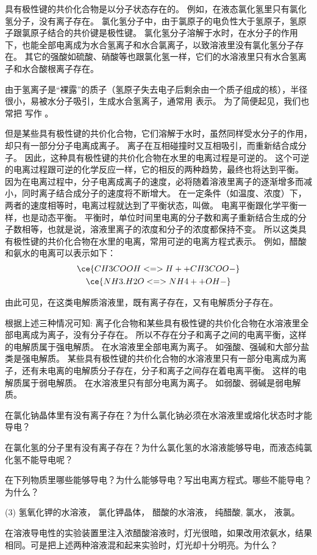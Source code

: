 具有极性键的共价化合物是以分子状态存在的。
例如，在液态氯化氢里只有氯化氢分子，没有离子存在。
氯化氢分子中，由于氯原子的电负性大于氢原子，氢原子跟氯原子结合的共价键是极性键。
氯化氢分子溶解于水时，在水分子的作用下，也能全部电离成为水合氢离子和水合氯离子，以致溶液里没有氯化氢分子存在。
其它的强酸如硫酸、硝酸等也跟氯化氢一样，它们的水溶液里只有水合氢离子和水合酸根离子存在。

由于氢离子是“裸露”的质子（氢原子失去电子后剩余由一个质子组成的核），半径很小，易被水分子吸引，生成水合氢离子，通常用  表示。
为了简便起见，我们也常把  写作 。

但是某些具有极性键的共价化合物，它们溶解于水时，虽然同样受水分子的作用，却只有一部分分子电离成离子。
离子在互相碰撞时又互相吸引，而重新结合成分子。
因此，这种具有极性键的共价化合物在水里的电离过程是可逆的。
这个可逆的电离过程跟可逆的化学反应一样，它的相反的两种趋势，最终也将达到平衡。
因为在电离过程中，分子电离成离子的速度，必将随着溶液里离子的逐渐增多而减小，同时离子结合成分子的速度将不断增大。
在一定条件（如温度、浓度）下，两者的速度相等时，电离过程就达到了平衡状态，叫做。
电离平衡跟化学平衡一样，也是动态平衡。
平衡时，单位时间里电离的分子数和离子重新结合生成的分子数相等，也就是说，溶液里离子的浓度和分子的浓度都保持不变。
所以这类具有极性键的共价化合物在水里的电离，常用可逆的电离方程式表示。
例如，醋酸和氨水的电离可以表示如下：
\begin{gather*}
  \ce{ CH3COOH <=> H+ + CH3COO-}\\
  \ce{ NH3.H2O <=> NH4+ + OH-}
\end{gather*}

由此可见，在这类电解质溶液里，既有离子存在，又有电解质分子存在。

根据上述三种情况可知: 离子化合物和某些具有极性键的共价化合物在水溶液里全部电离成为离子，没有分子存在。
所以不存在分子和离子之间的电离平衡，这样的电解质属于强电解质。
在水溶液里全部电离为离子。
如强酸、强碱和大部分盐类是强电解质。
某些具有极性键的共价化合物的水溶液里只有一部分电离成为离子，还有未电离的电解质分子存在，分子和离子之间存在着电离平衡。
这样的电解质属于弱电解质。
在水溶液里只有部分电离为离子。
如弱酸、弱碱是弱电解质。

\begin{Practice}[习题]
\begin{question}
  \item 在氯化钠晶体里有没有离子存在？为什么氯化钠必须在水溶液里或熔化状态时才能导电？
  \item 在氯化氢的分子里有没有离子存在？为什么氯化氢的水溶液能够导电，而液态纯氯化氢不能导电呢？
  \item 在下列物质里哪些能够导电？为什么能够导电？写出电离方程式。哪些不能导电？为什么？
  \begin{tasks}(3)
    \task 氢氧化钾的水溶液，
    \task 氯化钾晶体，
    \task 醋酸的水溶液，
    \task 纯醋酸,
    \task 氯水，
    \task 液氯。
  \end{tasks}
  \item 在溶液导电性的实验装置里注入浓醋酸溶液时，灯光很暗，如果改用浓氨水，结果相同。可是把上述两种溶液混和起来实验时，灯光却十分明亮。为什么？
\end{question}
\end{Practice}


